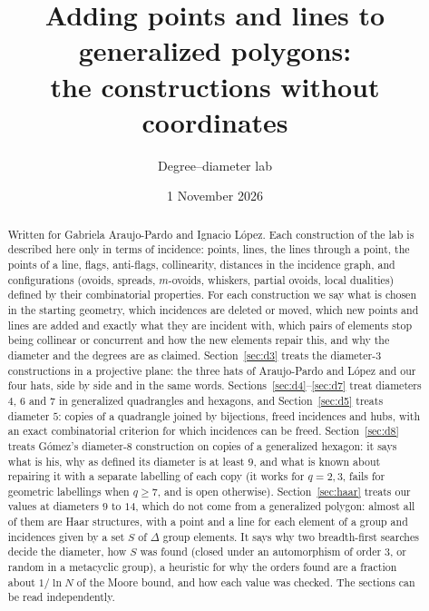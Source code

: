 \documentclass[11pt]{amsart}
\title[The constructions without coordinates]{Adding points and lines to generalized polygons:\\ the constructions without coordinates}
\author{Degree--diameter lab}
\date{1 November 2026}
\theoremstyle{definition}
\theoremstyle{remark}
\begin{document}
\begin{abstract}
Written for Gabriela Araujo-Pardo and Ignacio L\'opez. Each construction of the lab is described here only in terms of incidence: points, lines, the lines through a point, the points of a line, flags, anti-flags, collinearity, distances in the incidence graph, and configurations (ovoids, spreads, $m$-ovoids, whiskers, partial ovoids, local dualities) defined by their combinatorial properties. For each construction we say what is chosen in the starting geometry, which incidences are deleted or moved, which new points and lines are added and exactly what they are incident with, which pairs of elements stop being collinear or concurrent and how the new elements repair this, and why the diameter and the degrees are as claimed. Section~\ref{sec:d3} treats the diameter-$3$ constructions in a projective plane: the three hats of Araujo-Pardo and L\'opez and our four hats, side by side and in the same words. Sections~\ref{sec:d4}--\ref{sec:d7} treat diameters $4$, $6$ and $7$ in generalized quadrangles and hexagons, and Section~\ref{sec:d5} treats diameter $5$: copies of a quadrangle joined by bijections, freed incidences and hubs, with an exact combinatorial criterion for which incidences can be freed. Section~\ref{sec:d8} treats G\'omez's diameter-$8$ construction on copies of a generalized hexagon: it says what is his, why as defined its diameter is at least $9$, and what is known about repairing it with a separate labelling of each copy (it works for $q=2,3$, fails for geometric labellings when $q\ge7$, and is open otherwise). Section~\ref{sec:haar} treats our values at diameters $9$ to $14$, which do not come from a generalized polygon: almost all of them are Haar structures, with a point and a line for each element of a group and incidences given by a set $S$ of $\Delta$ group elements. It says why two breadth-first searches decide the diameter, how $S$ was found (closed under an automorphism of order $3$, or random in a metacyclic group), a heuristic for why the orders found are a fraction about $1/\ln N$ of the Moore bound, and how each value was checked. The sections can be read independently.
\end{abstract}

\maketitle
\end{document}

